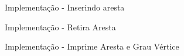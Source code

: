 \documentclass{if-beamer}
\begin{document}
\begin{frame}{Implementação - Inserindo aresta}
		
	
\end{frame}

\begin{frame}{Implementação - Retira Aresta}
		
	
\end{frame}

\begin{frame}{Implementação - Imprime Aresta e Grau Vértice}
		
	
\end{frame}
\end{document}
